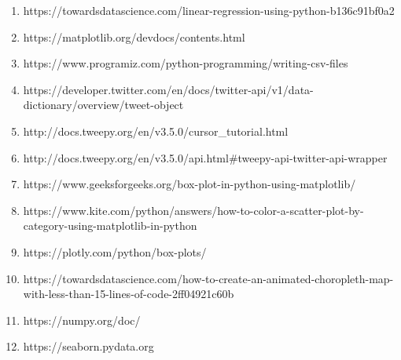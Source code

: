 \documentclass[a4paper, 11pt]{report}
\begin{document}
\begin{itemize}
\begin{enumerate}
    \item https://towardsdatascience.com/linear-regression-using-python-b136c91bf0a2

    \item https://matplotlib.org/devdocs/contents.html

    \item https://www.programiz.com/python-programming/writing-csv-files

    \item https://developer.twitter.com/en/docs/twitter-api/v1/data-dictionary/overview/tweet-object

    \item http://docs.tweepy.org/en/v3.5.0/cursor\_tutorial.html

    \item http://docs.tweepy.org/en/v3.5.0/api.html#tweepy-api-twitter-api-wrapper

    \item https://www.geeksforgeeks.org/box-plot-in-python-using-matplotlib/

    \item https://www.kite.com/python/answers/how-to-color-a-scatter-plot-by-category-using-matplotlib-in-python

    \item https://plotly.com/python/box-plots/

    \item https://towardsdatascience.com/how-to-create-an-animated-choropleth-map-with-less-than-15-lines-of-code-2ff04921c60b

    \item https://numpy.org/doc/

    \item https://seaborn.pydata.org
\end{enumerate}


\end{itemize}
\end{document}
